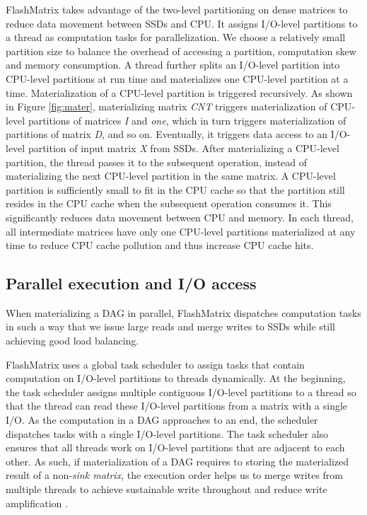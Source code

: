 FlashMatrix takes advantage of the two-level partitioning on dense matrices
to reduce data movement between SSDs and CPU. It assigns I/O-level partitions
to a thread as computation tasks for parallelization. We choose a relatively
small partition size to balance the overhead of accessing a partition,
computation skew and memory consumption. A thread further splits
an I/O-level partition into CPU-level partitions at run time and materializes
one CPU-level partition at a time. Materialization of a CPU-level partition
is triggered recursively. As shown in Figure \ref{fig:mater}, materializing
matrix \textit{CNT} triggers materialization of CPU-level partitions of matrices
\textit{I} and \textit{one}, which in turn triggers materialization of
partitions of matrix \textit{D}, and so on. Eventually, it triggers data access
to an I/O-level partition of input matrix \textit{X} from SSDs.
After materializing a CPU-level partition, the thread passes it to the subsequent
operation, instead of materializing the next CPU-level partition in the same matrix.
A CPU-level partition is sufficiently small to fit in the CPU cache so that
the partition still resides in the CPU cache when the subsequent operation consumes
it. This significantly reduces data movement between CPU and memory. In each
thread, all intermediate matrices have only one CPU-level partitions materialized
at any time to reduce CPU cache pollution and thus increase CPU cache hits.



\subsection{Parallel execution and I/O access}
When materializing a DAG in parallel, FlashMatrix dispatches computation tasks
in such a way that we issue large reads and merge writes to SSDs while still
achieving good load balancing.

FlashMatrix uses a global task scheduler to assign tasks that contain
computation on I/O-level partitions to threads dynamically. At the beginning,
the task scheduler assigns multiple contiguous I/O-level partitions to a thread
so that the thread can read these I/O-level partitions from a matrix with
a single I/O. As the computation in a DAG approaches to an end, the scheduler
dispatches tasks with a single I/O-level partitions. The task scheduler also
ensures that all threads work on I/O-level partitions that are adjacent to
each other. As such, if materialization of a DAG requires to storing the materialized
result of a non-\textit{sink matrix}, the execution order helps us to merge
writes from multiple threads to achieve sustainable write throughout and reduce
write amplification \cite{}.

